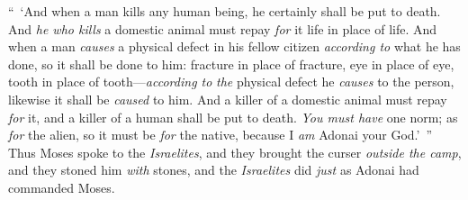 \begin{biblechapter}
\verse “ ‘And when a man kills any human being, he certainly shall be put to death.
\verse And \textit{he who kills} a domestic animal must repay \textit{for} it life in place of life.
\verse And when a man \textit{causes} a physical defect in his fellow citizen \textit{according to} what he has done, so it shall be done to him:
\verse fracture in place of fracture, eye in place of eye, tooth in place of tooth—\textit{according to} \textit{the} physical defect he \textit{causes} to the person, likewise it shall be \textit{caused} to him.
\verse And a killer of a domestic animal must repay \textit{for} it, and a killer of a human shall be put to death.
\verse \textit{You must have} one norm; as \textit{for} the alien, so it must be \textit{for} the native, because I \textit{am} Adonai your God.’ ”
\verse Thus Moses spoke to the \textit{Israelites}, and they brought the curser \textit{outside the camp}, and they stoned him \textit{with} stones, and the \textit{Israelites} did \textit{just} as Adonai had commanded Moses.
\end{biblechapter}

